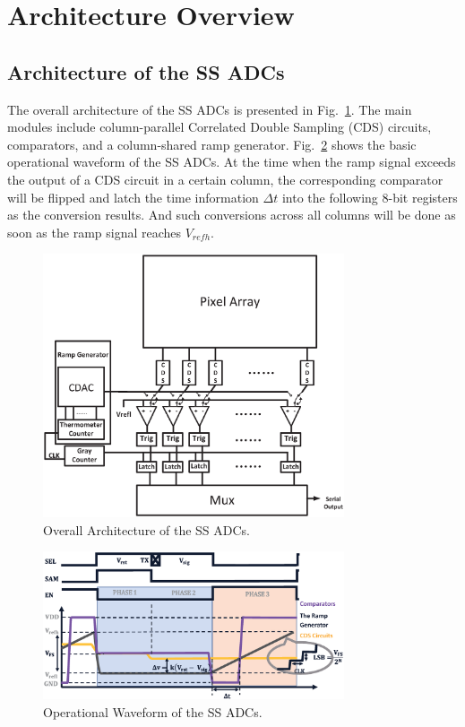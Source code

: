 \section{Architecture Overview}\label{architecture}

\subsection{Architecture of the SS ADCs}

The overall architecture of the SS ADCs is presented in Fig.~\ref{SSADC}. The main modules include column-parallel Correlated Double Sampling (CDS) circuits, comparators, 
and a column-shared ramp generator. Fig.~\ref{SSWAVE} shows the basic operational waveform of the SS ADCs. At the time when the ramp signal exceeds the output of a CDS circuit in a certain column, 
the corresponding comparator will be flipped and latch the time information $\Delta t$ into the following 8-bit registers as the conversion results. 
And such conversions across all columns will be done as soon as the ramp signal reaches $V_{refh}$.

\begin{figure}[htbp]
	\centerline{\includegraphics[width=3.5in]{./Figures/SSADC.eps}}
	\caption{Overall Architecture of the SS ADCs.}
	\label{SSADC}
\end{figure} 

\begin{figure}[htbp]
	\centerline{\includegraphics[width=3.5in]{./Figures/SSWAVE.eps}}
	\caption{Operational Waveform of the SS ADCs.}
	\label{SSWAVE}
\end{figure}

